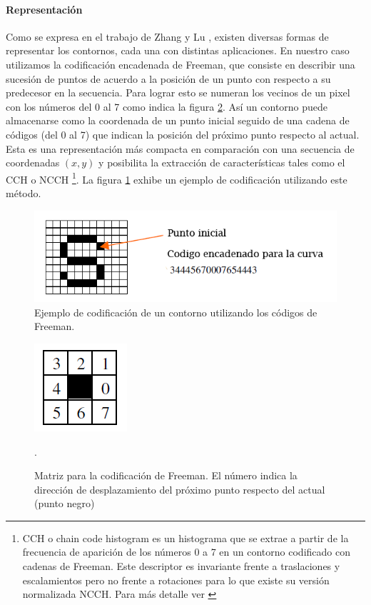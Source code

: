 	\paragraph{Representación}
	Como se expresa en el trabajo de Zhang y Lu \cite{Zhang02}, existen diversas formas de representar los contornos, cada una con
	distintas aplicaciones. En nuestro caso utilizamos la codificación 
	encadenada de Freeman, que consiste en describir una sucesión de puntos
	de acuerdo a la posición de un punto con respecto a su predecesor en 
	la secuencia. Para lograr esto se numeran los vecinos de un pixel con 
	los números del 0 al 7 como indica la figura \ref{fig:freeman}. Así un contorno puede almacenarse como la coordenada de
	un punto inicial seguido de una cadena de códigos (del 0 al 7) que indican la posición del próximo punto respecto al actual. Esta 
	es una representación más compacta en comparación con una secuencia 
	de coordenadas  $(x,y)$ y posibilita la extracción de 
	características tales como el CCH o NCCH \footnote{ CCH o chain 
	code histogram es un histograma que se extrae a partir de la 
	frecuencia de aparición de los números 0 a 7 en un contorno 
	codificado con cadenas de Freeman. Este descriptor es invariante 
	frente a traslaciones y escalamientos pero no frente a rotaciones 
	para lo que existe su versión normalizada NCCH. Para más detalle 
	ver \cite{Iivarinen96shaperecognition}}. La figura \ref{fig:freeman_sample} exhibe un 
	ejemplo de codificación utilizando este método.
	
	\begin{figure}[htpb]
\begin{center}
  \includegraphics[scale=0.6]{figuras/freeman-sample.png}
\end{center}	
  \caption{\small Ejemplo de codificación de un contorno utilizando los códigos de Freeman. }
  \label{fig:freeman_sample}
\end{figure}

\begin{figure}[htpb]
\begin{center}
  \includegraphics[scale=0.6]{figuras/freeman-codes.png}
\end{center}
  \caption{\small Matriz para la codificación de Freeman. El número indica la dirección de desplazamiento del próximo punto respecto del
  actual (punto negro) }.
  \label{fig:freeman}
\end{figure}
		
